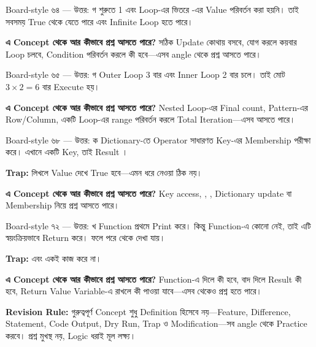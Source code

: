 \begin{explainbox}{Board-style ৬৪ — উত্তর: গ}
 শুরুতে 1 এবং Loop-এর ভিতরে -এর Value পরিবর্তন করা হয়নি। তাই  সবসময় True থেকে যেতে পারে এবং Infinite Loop হতে পারে।

\textbf{এ Concept থেকে আর কীভাবে প্রশ্ন আসতে পারে?} সঠিক Update কোথায় বসবে,  যোগ করলে কয়বার Loop চলবে, Condition পরিবর্তন করলে কী হবে—এসব angle থেকে প্রশ্ন আসতে পারে।
\end{explainbox}

\begin{explainbox}{Board-style ৬৫ — উত্তর: গ}
Outer Loop 3 বার এবং Inner Loop 2 বার চলে। তাই  মোট \(3 \times 2 = 6\) বার Execute হয়।

\textbf{এ Concept থেকে আর কীভাবে প্রশ্ন আসতে পারে?} Nested Loop-এর Final count, Pattern-এর Row/Column, একটি Loop-এর range পরিবর্তন করলে Total Iteration—এসব আসতে পারে।
\end{explainbox}

\begin{explainbox}{Board-style ৬৮ — উত্তর: ক}
Dictionary-তে  Operator সাধারণত Key-এর Membership পরীক্ষা করে। এখানে  একটি Key, তাই Result ।

\textbf{Trap:}  লিখলে Value দেখে True হবে—এমন ধরে নেওয়া ঠিক নয়।

\textbf{এ Concept থেকে আর কীভাবে প্রশ্ন আসতে পারে?} Key access, , , Dictionary update বা Membership নিয়ে প্রশ্ন আসতে পারে।
\end{explainbox}

\begin{explainbox}{Board-style ৭২ — উত্তর: খ}
 Function প্রথমে  Print করে। কিন্তু Function-এ কোনো  নেই, তাই এটি স্বয়ংক্রিয়ভাবে  Return করে। ফলে পরে  থেকে  দেখা যায়।

\textbf{Trap:}  এবং  একই কাজ করে না।

\textbf{এ Concept থেকে আর কীভাবে প্রশ্ন আসতে পারে?} Function-এ  দিলে কী হবে,  বাদ দিলে Result কী হবে, Return Value Variable-এ রাখলে কী পাওয়া যাবে—এসব থেকেও প্রশ্ন হতে পারে।
\end{explainbox}

\begin{rememberbox}
\textbf{Revision Rule:} গুরুত্বপূর্ণ Concept শুধু Definition হিসেবে নয়—Feature, Difference, Statement, Code Output, Dry Run, Trap ও Modification—সব angle থেকে Practice করবে। প্রশ্ন মুখস্থ নয়, Logic ধরাই মূল লক্ষ্য।
\end{rememberbox}

\RaggedRight
\small

